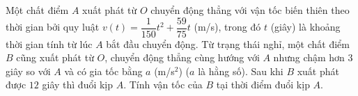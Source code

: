 \begin{bt}%
	Một chất điểm $A$ xuất phát từ $O$ chuyển động thẳng với vận tốc biến thiên theo thời gian bởi quy luật $v(t)=\dfrac{1}{150}t^2+\dfrac{59}{75}t$ (m/s), trong đó $t$ (giây) là khoảng thời gian tính từ lúc $A$ bắt đầu chuyển động. Từ trạng thái nghỉ, một chất điểm $B$ cũng xuất phát từ $O$, chuyển động thẳng cùng hướng với $A$ nhưng chậm hơn $3$ giây so với $A$ và có gia tốc bằng $a$ (m/s$^2$) ($a$	là hằng số). Sau khi $B$ xuất phát được $12$ giây thì đuổi kịp $A$. Tính vận tốc của $B$ tại thời điểm đuổi kịp $A$. 
\end{bt}

